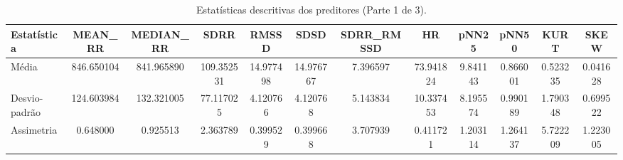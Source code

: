 \begin{table*}[!b]
\centering
\caption{Estatísticas descritivas dos preditores (Parte 1 de 3).}
\setlength{\tabcolsep}{0pt}
\begin{tabular*}{\textwidth}{@{\extracolsep{\fill}} l S[table-format=4.2] S[table-format=4.2] S[table-format=3.2] S[table-format=2.2] S[table-format=2.2] S[table-format=1.2] S[table-format=2.2] S[table-format=1.2] S[table-format=1.2] S[table-format=1.2] S[table-format=1.2] }
\toprule
\textbf{Estatística} & {MEAN\_RR} & {MEDIAN\_RR} & {SDRR} & {RMSSD} & {SDSD} & {SDRR\_RMSSD} & {HR} & {pNN25} & {pNN50} & {KURT} & {SKEW} \\
\midrule
Média           & 846.650104 & 841.965890 & 109.352531 & 14.977498 & 14.976767 & 7.396597 & 73.941824 & 9.841143 & 0.866001 & 0.523235 & 0.041628 \\
Desvio-padrão   & 124.603984 & 132.321005 & 77.117025 & 4.120766 & 4.120768 & 5.143834 & 10.337453 & 8.195574 & 0.990189 & 1.790348 & 0.699522 \\
Assimetria      & 0.648000 & 0.925513 & 2.363789 & 0.399529 & 0.399668 & 3.707939 & 0.411721 & 1.203114 & 1.264137 & 5.722209 & 1.223005 \\
\bottomrule
\end{tabular*}
\label{tab:estatisticas_part1of3}
\end{table*}

